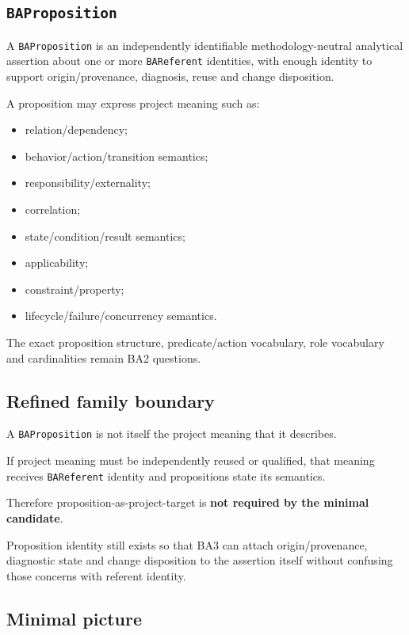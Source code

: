 \documentclass[
  10pt,
]{article}
\providecommand{\tightlist}{%
  \setlength{\itemsep}{0pt}\setlength{\parskip}{0pt}}
\begin{document}
\subsection{\texorpdfstring{\texttt{BAProposition}}{BAProposition}}\label{baproposition}

A \texttt{BAProposition} is an independently identifiable
methodology-neutral analytical assertion about one or more
\texttt{BAReferent} identities, with enough identity to support
origin/provenance, diagnosis, reuse and change disposition.

A proposition may express project meaning such as:

\begin{itemize}
\tightlist
\item
  relation/dependency;
\item
  behavior/action/transition semantics;
\item
  responsibility/externality;
\item
  correlation;
\item
  state/condition/result semantics;
\item
  applicability;
\item
  constraint/property;
\item
  lifecycle/failure/concurrency semantics.
\end{itemize}

The exact proposition structure, predicate/action vocabulary, role
vocabulary and cardinalities remain BA2 questions.

\subsection{Refined family boundary}\label{refined-family-boundary}

A \texttt{BAProposition} is not itself the project meaning that it
describes.

If project meaning must be independently reused or qualified, that
meaning receives \texttt{BAReferent} identity and propositions state its
semantics.

Therefore proposition-as-project-target is \textbf{not required by the
minimal candidate}.

Proposition identity still exists so that BA3 can attach
origin/provenance, diagnostic state and change disposition to the
assertion itself without confusing those concerns with referent
identity.

\subsection{Minimal picture}\label{minimal-picture}
\end{document}
